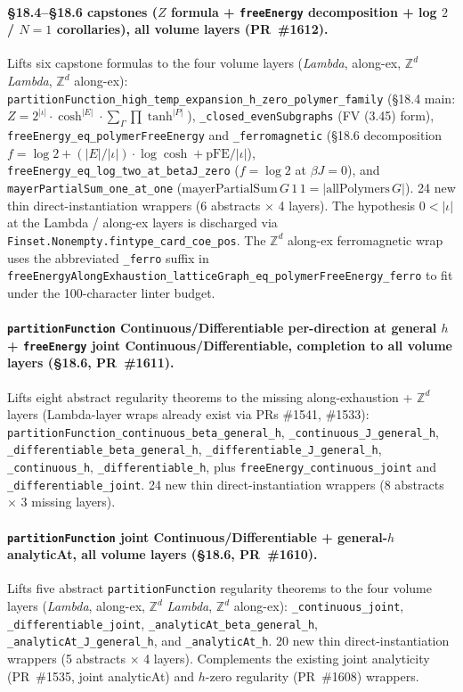 \documentclass[a4paper,11pt]{article}
\begin{document}
\paragraph{\S18.4--\S18.6 capstones ($Z$ formula +
\texttt{freeEnergy} decomposition + log $2$ / $N=1$ corollaries),
all volume layers (PR~\#1612).} Lifts six capstone formulas to the
four volume layers (\textit{Lambda}, along-ex, $\mathbb{Z}^d$
\textit{Lambda}, $\mathbb{Z}^d$ along-ex):
\texttt{partitionFunction\_high\_temp\_expansion\_h\_zero\_polymer\_family}
(\S18.4 main: $Z = 2^{|\iota|} \cdot \cosh^{|E|} \cdot
\sum_\Gamma \prod \tanh^{|P|}$),
\texttt{\_closed\_evenSubgraphs} (FV (3.45) form),
\texttt{freeEnergy\_eq\_polymerFreeEnergy} and
\texttt{\_ferromagnetic} (\S18.6 decomposition $f = \log 2 +
(|E|/|\iota|) \cdot \log \cosh + \mathrm{pFE} / |\iota|$),
\texttt{freeEnergy\_eq\_log\_two\_at\_betaJ\_zero} ($f = \log 2$
at $\beta J = 0$), and \texttt{mayerPartialSum\_one\_at\_one}
($\mathrm{mayerPartialSum}\,G\,1\,1 = |\mathrm{allPolymers}\,G|$).
24 new thin direct-instantiation wrappers (6 abstracts $\times$
4 layers). The hypothesis $0 < |\iota|$ at the Lambda / along-ex
layers is discharged via \texttt{Finset.Nonempty.fintype\_card\_coe\_pos}.
The $\mathbb{Z}^d$ along-ex ferromagnetic wrap uses the
abbreviated \texttt{\_ferro} suffix in
\texttt{freeEnergyAlongExhaustion\_latticeGraph\_eq\_polymerFreeEnergy\_ferro}
to fit under the 100-character linter budget.

\paragraph{\texttt{partitionFunction}
Continuous/Differentiable per-direction at general $h$ +
\texttt{freeEnergy} joint Continuous/Differentiable, completion
to all volume layers (\S18.6, PR~\#1611).} Lifts eight abstract
regularity theorems to the missing along-exhaustion +
$\mathbb{Z}^d$ layers (Lambda-layer wraps already exist via PRs
\#1541, \#1533):
\texttt{partitionFunction\_continuous\_beta\_general\_h},
\texttt{\_continuous\_J\_general\_h},
\texttt{\_differentiable\_beta\_general\_h},
\texttt{\_differentiable\_J\_general\_h},
\texttt{\_continuous\_h},
\texttt{\_differentiable\_h}, plus
\texttt{freeEnergy\_continuous\_joint} and
\texttt{\_differentiable\_joint}. 24 new thin
direct-instantiation wrappers (8 abstracts $\times$ 3 missing
layers).

\paragraph{\texttt{partitionFunction} joint
Continuous/Differentiable + general-$h$ analyticAt, all volume
layers (\S18.6, PR~\#1610).} Lifts five abstract
\texttt{partitionFunction} regularity theorems to the four
volume layers (\textit{Lambda}, along-ex, $\mathbb{Z}^d$ \textit{Lambda},
$\mathbb{Z}^d$ along-ex):
\texttt{\_continuous\_joint},
\texttt{\_differentiable\_joint},
\texttt{\_analyticAt\_beta\_general\_h},
\texttt{\_analyticAt\_J\_general\_h}, and
\texttt{\_analyticAt\_h}. 20 new thin direct-instantiation
wrappers (5 abstracts $\times$ 4 layers). Complements the
existing joint analyticity (PR~\#1535, joint analyticAt) and
$h$-zero regularity (PR~\#1608) wrappers.
\end{document}
